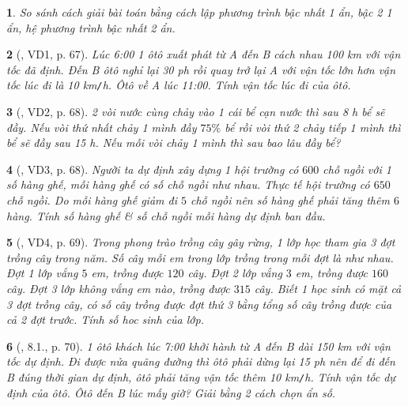 \documentclass{article}
\newtheorem{baitoan}{}
\begin{document}
\begin{baitoan}
	So sánh cách giải bài toán bằng cách lập phương trình bậc nhất 1 ẩn, bậc 2 1 ẩn, hệ phương trình bậc nhất 2 ẩn.
\end{baitoan}

\begin{baitoan}[\cite{Binh_boi_duong_Toan_9_tap_2}, VD1, p. 67]
	Lúc {\rm6:00} 1 ôtô xuất phát từ A đến B cách nhau {\rm100 km} với vận tốc đã định. Đến B ôtô nghỉ lại {\rm30 ph} rồi quay trở lại A với vận tốc lớn hơn vận tốc lúc đi là {\rm10 km{\tt/}h}. Ôtô về A lúc {\rm11:00}. Tính vận tốc lúc đi của ôtô.
\end{baitoan}

\begin{baitoan}[\cite{Binh_boi_duong_Toan_9_tap_2}, VD2, p. 68]
	2 vòi nước cùng chảy vào 1 cái bể cạn nước thì sau {\rm8 h} bể sẽ đầy. Nếu vòi thứ nhất chảy 1 mình đầy $75\%$ bể rồi vòi thứ 2 chảy tiếp 1 mình thì bể sẽ đầy sau {\rm15 h}. Nếu mỗi vòi chảy 1 mình thì sau bao lâu đầy bể?
\end{baitoan}

\begin{baitoan}[\cite{Binh_boi_duong_Toan_9_tap_2}, VD3, p. 68]
	Người ta dự định xây dựng 1 hội trường có $600$ chỗ ngồi với 1 số hàng ghế, mỗi hàng ghế có số chỗ ngồi như nhau. Thực tế hội trường có $650$ chỗ ngồi. Do mỗi hàng ghế giảm đi $5$ chỗ ngồi nên số hàng ghế phải tăng thêm $6$ hàng. Tính số hàng ghế \& số chỗ ngồi mỗi hàng dự định ban đầu.
\end{baitoan}

\begin{baitoan}[\cite{Binh_boi_duong_Toan_9_tap_2}, VD4, p. 69]
	Trong phong trào trồng cây gây rừng, 1 lớp học tham gia 3 đợt trồng cây trong năm. Số cây mỗi em trong lớp trồng trong mỗi đợt là như nhau. Đợt 1 lớp vắng $5$ em, trồng được $120$ cây. Đợt 2 lớp vắng $3$ em, trồng được $160$ cây. Đợt 3 lớp không vắng em nào, trồng được $315$ cây. Biết 1 học sinh có mặt cả 3 đợt trồng cây, có số cây trồng được đợt thứ 3 bằng tổng số cây trồng được của cả 2 đợt trước. Tính số hoc sinh của lớp.
\end{baitoan}

\begin{baitoan}[\cite{Binh_boi_duong_Toan_9_tap_2}, 8.1., p. 70]
	1 ôtô khách lúc {\rm7:00} khởi hành từ A đến B dài {\rm150 km} với vận tốc dự định. Đi được nửa quãng đường thì ôtô phải dừng lại {\rm15 ph} nên để đi đến B đúng thời gian dự định, ôtô phải tăng vận tốc thêm {\rm10 km{\tt/}h}. Tính vận tốc dự định của ôtô. Ôtô đến B lúc mấy giờ? Giải bằng 2 cách chọn ẩn số.
\end{baitoan}
\end{document}
